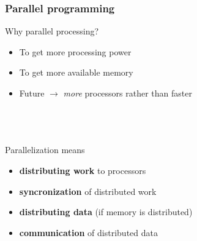 \documentclass[mathserif]{beamer}
\begin{document}
\begin{frame}
    \frametitle{Parallel programming}
    Why parallel processing?
    \begin{itemize}
	\item	To get more processing power
	\item	To get more available memory
	\item	Future $\rightarrow$ \emph{more} processors rather than faster
    \end{itemize}
    \ \\
    \ \\
    \ \\
    Parallelization means
    \begin{itemize}
	\item	\textbf{distributing work} to processors
	\item	\textbf{syncronization} of distributed work
	\item	\textbf{distributing data} (if memory is distributed)
	\item	\textbf{communication} of distributed data
    \end{itemize}
\end{frame}
\end{document}
